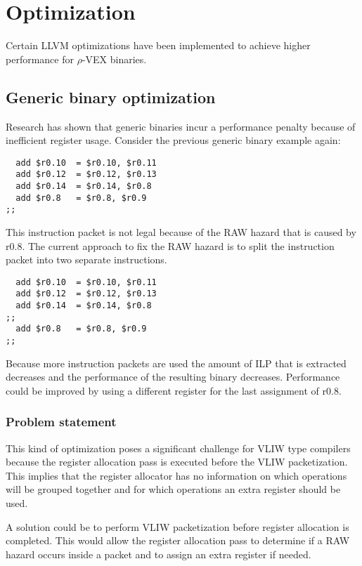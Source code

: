 \chapter{Optimization}
\label{chap:optimization}

Certain LLVM optimizations have been implemented to achieve higher performance for $\rho$-VEX binaries.

\section{Generic binary optimization}
Research has shown \cite{Anthony-Brandon:2013jk} that generic binaries incur a performance penalty because of inefficient register usage. Consider the previous generic binary example again:

\begin{lstlisting}
  add $r0.10  = $r0.10, $r0.11
  add $r0.12  = $r0.12, $r0.13
  add $r0.14  = $r0.14, $r0.8
  add $r0.8   = $r0.8, $r0.9
;;
\end{lstlisting}

This instruction packet is not legal because of the RAW hazard that is caused by r0.8. The current approach to fix the RAW hazard is to split the instruction packet into two separate instructions. 

\begin{lstlisting}
  add $r0.10  = $r0.10, $r0.11
  add $r0.12  = $r0.12, $r0.13
  add $r0.14  = $r0.14, $r0.8
;;
  add $r0.8   = $r0.8, $r0.9
;;
\end{lstlisting}

Because more instruction packets are used the amount of ILP that is extracted decreases and the performance of the resulting binary decreases. Performance could be improved by using a different register for the last assignment of r0.8. 

\subsection{Problem statement}
This kind of optimization poses a significant challenge for VLIW type compilers because the register allocation pass is executed before the VLIW packetization. This implies that the register allocator has no information on which operations will be grouped together and for which operations an extra register should be used.

A solution could be to perform VLIW packetization before register allocation is completed. This would allow the register allocation pass to determine if a RAW hazard occurs inside a packet and to assign an extra register if needed.

